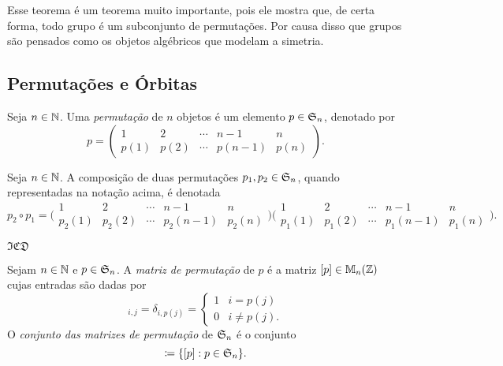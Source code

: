 	Esse teorema é um teorema muito importante, pois ele mostra que, de certa forma, todo grupo é um subconjunto de permutações. Por causa disso que grupos são pensados como os objetos algébricos que modelam a simetria.

\subsection{Permutações e Órbitas}

\begin{defi} Seja $n \in \mathbb{N}$. Uma \emph{permutação} de $n$ objetos é um elemento $p \in \mathfrak{S}_n$, denotado por
	\begin{equation*}
	p = \begin{pmatrix}
				1 & 2 & \cdots & n-1 & n \\
				p(1) & p(2) & \cdots &  p(n-1)  & p(n)
			\end{pmatrix}.
	\end{equation*}
\end{defi}

\begin{nota}
	Seja $n \in \mathbb{N}$. A composição de duas permutações $p_1,p_2 \in \mathfrak{S}_n$, quando representadas na notação acima, é denotada
	\begin{equation*}
	p_2 \circ p_1 = \bigl(\begin{smallmatrix}
				1 & 2 & \cdots & n-1 & n \\
				p_2(1) & p_2(2) & \cdots &  p_2(n-1)  & p_2(n)
			\end{smallmatrix}\bigr)
			\bigl(\begin{smallmatrix}
				1 & 2 & \cdots & n-1 & n \\
				p_1(1) & p_1(2) & \cdots &  p_1(n-1)  & p_1(n)
			\end{smallmatrix}\bigr).
	\end{equation*}
\end{nota}
$\mathfrak{I} \mathfrak{C} \mathfrak{D}$
\begin{defi}
	Sejam $n \in \mathbb{N}$ e $p \in \mathfrak{S}_n$. A \emph{matriz de permutação} de $p$ é a matriz $[p] \in \mathbb M_n (\mathbb{Z})$ cujas entradas são dadas por
	\begin{equation*}
		[p]_{i,j} = \delta_{i,p(j)} = \begin{cases}
												1 & i=p(j) \\
												0 & i \neq p(j).
												\end{cases}
	\end{equation*}
	O \emph{conjunto das matrizes de permutação} de $\mathfrak{S}_n$ é o conjunto
	\begin{equation*}
		[\sime_n] \coloneqq \{[p] : p \in \sime_n\}.
	\end{equation*}
\end{defi}

